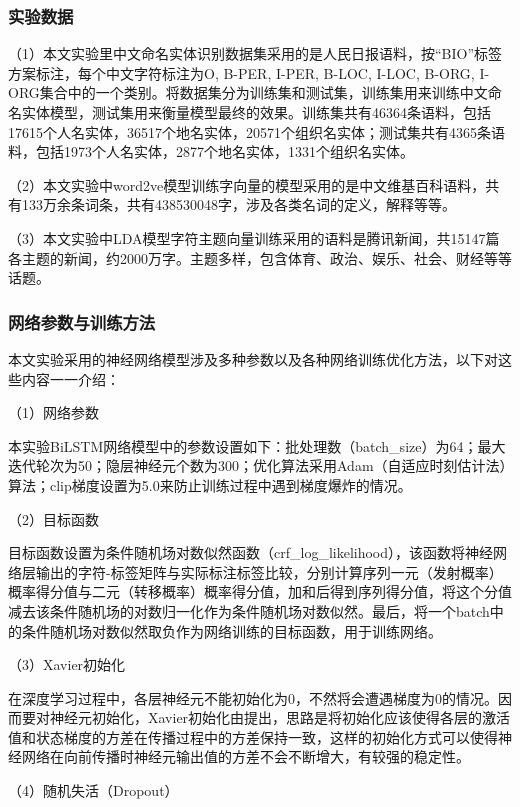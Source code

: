 \documentclass[winfonts,master,oneside,nobackinfo]{njuthesis}
\begin{document}
\subsubsection{实验数据}

（1）本文实验里中文命名实体识别数据集采用的是人民日报语料，按“BIO”标签方案标注，每个中文字符标注为{O, B-PER, I-PER, B-LOC, I-LOC, B-ORG, I-ORG}集合中的一个类别。将数据集分为训练集和测试集，训练集用来训练中文命名实体模型，测试集用来衡量模型最终的效果。训练集共有46364条语料，包括17615个人名实体，36517个地名实体，20571个组织名实体；测试集共有4365条语料，包括1973个人名实体，2877个地名实体，1331个组织名实体。

（2）本文实验中word2ve模型训练字向量的模型采用的是中文维基百科语料，共有133万余条词条，共有438530048字，涉及各类名词的定义，解释等等。

（3）本文实验中LDA模型字符主题向量训练采用的语料是腾讯新闻，共15147篇各主题的新闻，约2000万字。主题多样，包含体育、政治、娱乐、社会、财经等等话题。

\subsubsection{网络参数与训练方法}

本文实验采用的神经网络模型涉及多种参数以及各种网络训练优化方法，以下对这些内容一一介绍：

（1）网络参数

本实验BiLSTM网络模型中的参数设置如下：批处理数（batch\_size）为64；最大迭代轮次为50；隐层神经元个数为300；优化算法采用Adam\cite{Adam}（自适应时刻估计法）算法；clip梯度设置为5.0来防止训练过程中遇到梯度爆炸的情况。

（2）目标函数

目标函数设置为条件随机场对数似然函数（crf\_log\_likelihood），该函数将神经网络层输出的字符-标签矩阵与实际标注标签比较，分别计算序列一元（发射概率）概率得分值与二元（转移概率）概率得分值，加和后得到序列得分值，将这个分值减去该条件随机场的对数归一化作为条件随机场对数似然。最后，将一个batch中的条件随机场对数似然取负作为网络训练的目标函数，用于训练网络。

（3）Xavier初始化

在深度学习过程中，各层神经元不能初始化为0，不然将会遭遇梯度为0的情况。因而要对神经元初始化，Xavier初始化由\cite{Glorot}提出，思路是将初始化应该使得各层的激活值和状态梯度的方差在传播过程中的方差保持一致，这样的初始化方式可以使得神经网络在向前传播时神经元输出值的方差不会不断增大，有较强的稳定性。

（4）随机失活（Dropout）
\end{document}
